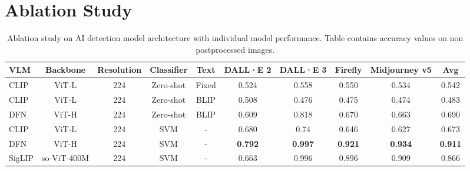 \section{Ablation Study}
\label{sec:ablation}
\begin{table}[h]
    \centering
    \small
    \begin{tabular}{lccccccccc}
        \toprule
        VLM & Backbone&Resolution & Classifier & Text & DALL·E 2 & DALL·E 3 & Firefly & Midjourney v5 & Avg \\
        \midrule 
        CLIP & ViT-L & 224& Zero-shot & Fixed & 0.524&0.558&0.550&0.534&0.542 \\
        CLIP & ViT-L & 224& Zero-shot & BLIP & 0.508&0.476&0.475&0.474& 0.483 \\
        DFN & ViT-H & 224& Zero-shot & BLIP &0.609&0.818&0.670&0.663 & 0.690 \\
        CLIP & ViT-L & 224 & SVM & - &  0.680&0.74&0.646&0.627&0.673 \\
        DFN & ViT-H & 224& SVM & - & \textbf{0.792} & \textbf{0.997} & \textbf{0.921} & \textbf{0.934} & \textbf{0.911} \\
        SigLIP & so-ViT-400M & 224& SVM & - & 0.663 & 0.996 & 0.896 & 0.909 & 0.866 \\
        \bottomrule
    \end{tabular}
    \caption{Ablation study on AI detection model architecture with individual model performance. Table contains accuracy values on non postprocessed images.}
    \label{tab:ablation_expanded}
\end{table}
